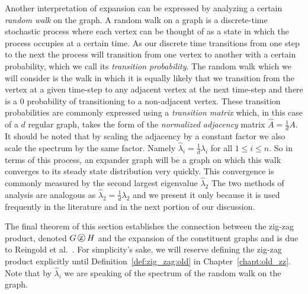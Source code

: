 Another interpretation of expansion can be expressed by analyzing a certain {\em random walk} on the graph. A random walk on a graph is a discrete-time stochastic process where each vertex can be thought of as a state in which the process occupies at a certain time. As our discrete time transitions from one step to the next the process will transition from one vertex to another with a certain probability, which we call its {\em transition probability}. The random walk which we will consider is the walk in which it is equally likely that we transition from the vertex at a given time-step to any adjacent vertex at the next time-step and there is a $0$ probability of transitioning to a non-adjacent vertex. These transition probabilities are commonly expressed using a {\em transition matrix} which, in this case of a $d$ regular graph, takes the form of the {\em normalized adjacency} matrix $\hat{A} = \frac{1}{d} A$.  It should be noted that by scaling the adjacency by a constant factor we also scale the spectrum by the same factor. Namely $\hat{\lambda}_i = \frac{1}{d} \lambda_i$ for all $1\leq i \leq n$. So in terms of this process,  an expander graph will be a graph on which this walk converges to its steady state distribution very quickly. This convergence is commonly measured by the second largest eigenvalue $\hat{\lambda}_2$ The two methods of analysis are analogous as $\hat{\lambda}_2 = \frac{1}{d} \lambda_2$ and we present it only because it is used frequently in the literature and in the next portion of our discussion.  
 
The final theorem of this section establishes the connection between the zig-zag product, denoted $G \zigzag H$ and the expansion of the constituent graphs and is due to Reingold {et al.}~\cite{Reingold:2002ys}. For simplicity's sake, we will reserve defining the zig-zag product explicitly until Definition~\ref{def:zig_zag:old} in Chapter~\ref{chapt:old_zz}. Note that by $\hat{\lambda}_i$ we are speaking of the spectrum of the random walk on the graph. 

